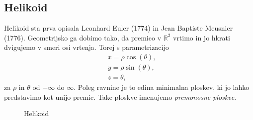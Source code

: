 \documentclass[fin1, tisk, bibtex]{fmfdelo}
\newcommand{\samplescalar}{50} %
\begin{document}
\subsection{Helikoid}

Helikoid sta prva opisala Leonhard Euler (1774) in Jean Baptiste Meusnier (1776). Geometrijsko ga dobimo tako, da premico v $\mathbb{R}^2$ vrtimo in jo hkrati dvigujemo v smeri osi vrtenja. Torej s parametrizacijo
\begin{align*}
    & x=\rho \cos (\theta), \\
    & y=\rho \sin (\theta), \\
    & z=\theta,
\end{align*}
za $\rho$ in $\theta$ od $-\infty$ do $\infty$.
Poleg ravnine je to edina minimalna ploskev, ki jo lahko predstavimo kot unijo premic. Take ploskve imenujemo \emph{premonosne ploskve}.

\begin{figure}[ht]
    \centering

    \caption{Helikoid}
\end{figure}
\end{document}
